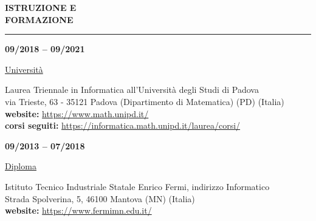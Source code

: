\begin{minipage}[b]{0.3\textwidth}
	\textbf{ISTRUZIONE E \\FORMAZIONE}
\end{minipage}%
\hfill
\hfill
\begin{minipage}[t]{0.6\textwidth}		
	\rule{\textwidth}{0.4pt}
\end{minipage}%
\vspace{5mm}



\begin{minipage}[t]{0.3\textwidth}
	\textbf{09/2018 – 09/2021}
\end{minipage}%
\hfill
\hfill
\begin{minipage}[t]{0.6\textwidth}		
	\begin{Large}
		\underline{Università} \vspace{5mm}\\
	\end{Large}
	Laurea Triennale in Informatica all'Università degli Studi di Padova\\
	via Trieste, 63 - 35121 Padova (Dipartimento di Matematica) (PD) (Italia) \\
	\textbf{website:} \url{https://www.math.unipd.it/}\\
	\textbf{corsi seguiti:} \url{https://informatica.math.unipd.it/laurea/corsi/}\\
	\vspace{4mm}
\end{minipage}%


\begin{minipage}[t]{0.3\textwidth}
	\textbf{09/2013 – 07/2018}
\end{minipage}%
\hfill
\hfill
\begin{minipage}[t]{0.6\textwidth}		
	\begin{Large}
		\underline{Diploma} \vspace{5mm}\\
	\end{Large}
	Istituto Tecnico Industriale Statale Enrico Fermi, indirizzo Informatico\\
	Strada Spolverina, 5, 46100 Mantova (MN) (Italia) \\
	\textbf{website:} \url{https://www.fermimn.edu.it/} \vspace{1mm}\\
	\vspace{4mm}
\end{minipage}%